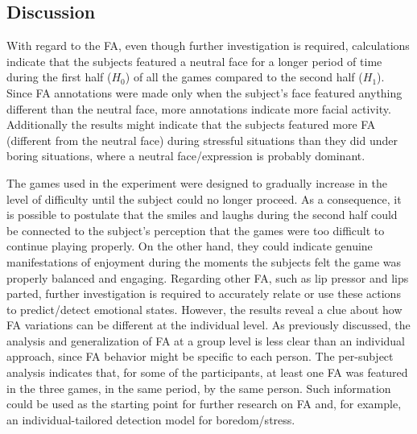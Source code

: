 \subsection{Discussion}

With regard to the FA, even though further investigation is required, calculations indicate that the subjects featured a neutral face for a longer period of time during the first half ($H_0$) of all the games compared to the second half ($H_1$). Since FA annotations were made only when the subject's face featured anything different than the neutral face, more annotations indicate more facial activity. Additionally the results might indicate that the subjects featured more FA (different from the neutral face) during stressful situations than they did under boring situations, where a neutral face/expression is probably dominant.

The games used in the experiment were designed to gradually increase in the level of difficulty until the subject could no longer proceed. As a consequence, it is possible to postulate that the smiles and laughs during the second half could be connected to the subject's perception that the games were too difficult to continue playing properly. On the other hand, they could indicate genuine manifestations of enjoyment during the moments the subjects felt the game was properly balanced and engaging. Regarding other FA, such as lip pressor and lips parted, further investigation is required to accurately relate or use these actions to predict/detect emotional states. However, the results reveal a clue about how FA variations can be different at the individual level. As previously discussed, the analysis and generalization of FA at a group level is less clear than an individual approach, since FA behavior might be specific to each person. The per-subject analysis indicates that, for some of the participants, at least one FA was featured in the three games, in the same period, by the same person. Such information could be used as the starting point for further research on FA and, for example, an individual-tailored detection model for boredom/stress.


